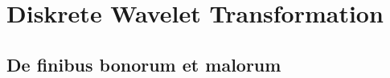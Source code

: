 %
%
%
%
\section{Diskrete Wavelet Transformation 
\label{jpeg:section:dwt}}


\subsection{De finibus bonorum et malorum
\label{jpeg:subsection:bonorum}}


